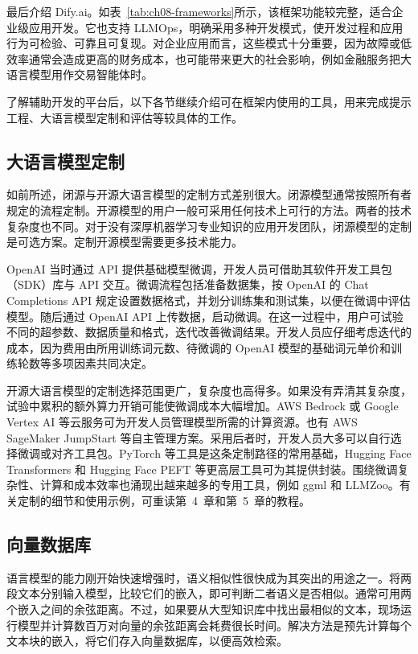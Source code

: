 最后介绍 Dify.ai。如表~\ref{tab:ch08-frameworks}所示，该框架功能较完整，适合企业级应用开发。它也支持 LLMOps，明确采用多种开发模式，使开发过程和应用行为可检验、可靠且可复现。对企业应用而言，这些模式十分重要，因为故障或低效率通常会造成更高的财务成本，也可能带来更大的社会影响，例如金融服务把大语言模型用作交易智能体时。

了解辅助开发的平台后，以下各节继续介绍可在框架内使用的工具，用来完成提示工程、大语言模型定制和评估等较具体的工作。

\subsection{大语言模型定制}
如前所述，闭源与开源大语言模型的定制方式差别很大。闭源模型通常按照所有者规定的流程定制。开源模型的用户一般可采用任何技术上可行的方法。两者的技术复杂度也不同。对于没有深厚机器学习专业知识的应用开发团队，闭源模型的定制是可选方案。定制开源模型需要更多技术能力。

OpenAI 当时通过 API 提供基础模型微调，开发人员可借助其软件开发工具包（SDK）库与 API 交互。微调流程包括准备数据集，按 OpenAI 的 Chat Completions API 规定设置数据格式，并划分训练集和测试集，以便在微调中评估模型。随后通过 OpenAI API 上传数据，启动微调。在这一过程中，用户可试验不同的超参数、数据质量和格式，迭代改善微调结果。开发人员应仔细考虑迭代的成本，因为费用由所用训练词元数、待微调的 OpenAI 模型的基础词元单价和训练轮数等多项因素共同决定。

开源大语言模型的定制选择范围更广，复杂度也高得多。如果没有弄清其复杂度，试验中累积的额外算力开销可能使微调成本大幅增加。AWS Bedrock 或 Google Vertex AI 等云服务可为开发人员管理模型所需的计算资源。也有 AWS SageMaker JumpStart 等自主管理方案。采用后者时，开发人员大多可以自行选择微调或对齐工具包。PyTorch 等工具是这条定制路径的常用基础，Hugging Face Transformers 和 Hugging Face PEFT 等更高层工具可为其提供封装。围绕微调复杂性、计算和成本效率也涌现出越来越多的专用工具，例如 ggml 和 LLMZoo。有关定制的细节和使用示例，可重读第~4~章和第~5~章的教程。

\subsection{向量数据库}
语言模型的能力刚开始快速增强时，语义相似性很快成为其突出的用途之一。将两段文本分别输入模型，比较它们的嵌入，即可判断二者语义是否相似。通常可用两个嵌入之间的余弦距离。不过，如果要从大型知识库中找出最相似的文本，现场运行模型并计算数百万对向量的余弦距离会耗费很长时间。解决方法是预先计算每个文本块的嵌入，将它们存入向量数据库，以便高效检索。

